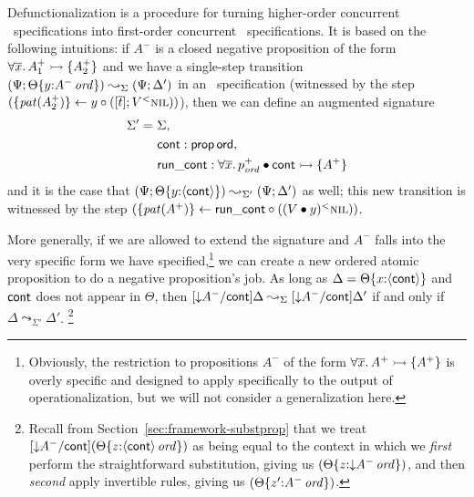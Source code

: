 Defunctionalization is a procedure for turning higher-order
concurrent \sls~specifications into first-order concurrent
\sls~specifications. It is based on the following intuitions:
if $A^-$ is a closed negative proposition
of the form $\forall \overline{x}.\,A^+_1 \rightarrowtail \{ A^+_2 \}$
and we have a single-step transition 
$(\Psi; {\Theta}\{{y{:}{A^-}\,{{\it ord}}}\}) 
 \leadsto_{\Sigma} 
 (\Psi; \Delta')$
in an \sls~specification (witnessed by the step 
$(\{{{\it pat}({A^+_2})}\} \leftarrow {y} \circ {([{\overline{t}}]; {{V}{^{<}}{\textsc{nil}}})})$), 
then we can define an augmented signature
\begin{align*}
\Sigma' = ~ & \Sigma, 
\\    ~~ & {\sf cont} : {\sf prop\,ord}, 
\\    ~~ & {\sf run\_cont} : \forall{\overline x}.\,p^+_{\it ord} \mathbin{\bullet} {\sf cont} \rightarrowtail \{ A^+ \}
\end{align*}
and it is the case that 
$(\Psi; {\Theta}\{{y{:}\langle {\sf cont} \rangle}\}) 
 \leadsto_{\Sigma'} 
 (\Psi; \Delta')$
as well; this new transition is witnessed by the step
$(\{{{\it pat}({A^+})}\} \leftarrow {\sf run\_cont} \circ {({({V} \mathbin{\bullet}{y})}{^{<}}{\textsc{nil}})})$.

More generally, if we are allowed to extend the signature and $A^-$
falls into the very specific form we have
specified,\footnote{Obviously, the restriction to propositions $A^-$
  of the form $\forall \overline{x}.\,A^+ \rightarrowtail \{ A^+ \}$ is
  overly specific and designed to apply specifically to the output of
  operationalization, but we will not consider a generalization here.}
we can create
a new ordered atomic proposition to do a negative proposition's
job. As long as $\Delta = {\Theta}\{{x{:}\langle {\sf cont} \rangle}\}$ and
${\sf cont}$ does not appear in $\Theta$, then $[{\downarrow}A^- /{\sf
  cont}]\Delta \leadsto_\Sigma [{\downarrow}A^- /{\sf cont}]\Delta'$
if and only if $\Delta \leadsto_{\Sigma'} \Delta'$. \footnote{Recall
  from Section~\ref{sec:framework-substprop} that we treat
  $[{\downarrow}A^-/{\sf cont}]({\Theta}\{{z{:}{\langle {\sf cont} \rangle}\,{{\it ord}}}\})$
  as being equal to the context in which we {\it first} perform the
  straightforward substitution, giving us
  $({\Theta}\{{z{:}{{\downarrow}A^-}\,{{\it ord}}}\})$, and then {\it
    second} apply invertible rules, giving us
  $({\Theta}\{{z'{:}{A^-}\,{{\it ord}}}\})$.} 

